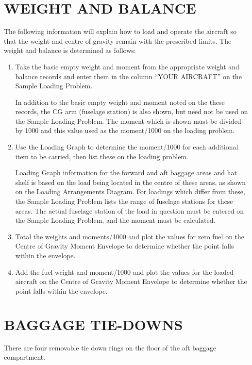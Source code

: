 \clearpage

\section{WEIGHT AND BALANCE}

The following information will explain how to load and operate the aircraft so that the weight and centre of gravity remain with the prescribed limits. The weight and balance is determined as follows:

\begin{enumerate}
\item Take the basic empty weight and moment from the appropriate weight and balance records and enter them in the column ``YOUR AIRCRAFT'' on the Sample Loading Problem.
\begin{Note}
In addition to the basic empty weight and moment noted on the these records, the CG arm (fuselage station) is also shown, but need not be used on the Sample Loading Problem. The moment which is shown must be divided by 1000 and this value used as the moment/1000 on the loading problem.
\end{Note}
\item Use the Loading Graph to determine the moment/1000 for each additional item to be carried, then list these on the loading problem.
\begin{Note}
Loading Graph information for the forward and aft baggage areas and hat shelf is based on the
 load being located in the centre of these areas, as shown on the Loading Arrangements 
 Diagram. For loadings which differ from these, the Sample Loading Problem lists the range of fuselage 
 stations for these areas. The actual fuselage station of the load in question must be entered on the Sample Loading Problem, and the moment must be calculated.
\end{Note}

\item Total the weights and moments/1000 and plot the values for zero fuel on the Centre of Gravity Moment Envelope to determine whether the point falls within the envelope.
\item Add the fuel weight and moment/1000 and plot the values for the loaded aircraft on the Centre of Gravity Moment Envelope to determine whether the point falls within the envelope.
\end{enumerate}

\section{BAGGAGE TIE-DOWNS}
There are four removable tie down rings on the floor of the aft baggage compartment.

